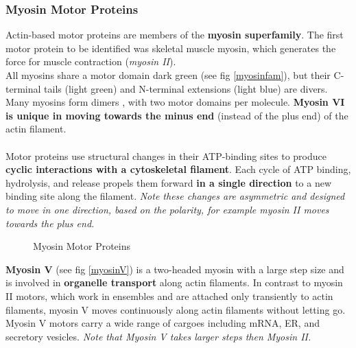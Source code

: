 \documentclass[../main.tex]{subfiles}
\begin{document}
\subsubsection{Myosin Motor Proteins}
Actin-based motor proteins are members of the \textbf{myosin superfamily}. The first motor protein to be identified was skeletal muscle myosin, which generates the force for muscle contraction (\textit{myosin II}). \\
\indent All myosins share a motor domain dark green (see fig \ref{myosinfam}), but their C-terminal tails (light green) and N-terminal extensions (light blue) are divers. \\
\indent Many myosins form dimers , with two motor domains per molecule. \textbf{Myosin VI is unique in moving towards the minus end} (instead of the plus end) of the actin filament. \\
\\
Motor proteins use structural changes in their ATP-binding sites to produce \textbf{cyclic interactions with a cytoskeletal filament}. Each cycle of ATP binding, hydrolysis, and release propels them forward \textbf{in a single direction} to a new binding site along the filament. \textit{Note these changes are asymmetric and designed to move in one direction, based on the polarity, for example myosin II moves towards the plus end.} 
\begin{figure}[H]
	\centering
	\caption{Myosin Motor Proteins}
\end{figure}
\indent \textbf{Myosin V} (see fig \ref{myosinV}) is a two-headed myosin with a large step size and is involved in \textbf{organelle transport} along actin filaments. In contrast to myosin II motors, which work in ensembles and are attached only transiently to actin filaments, myosin V moves continuously along actin  filaments without letting go. Myosin V motors carry a wide range of cargoes including mRNA, ER, and secretory vesicles. \textit{Note that Myosin V takes larger steps then Myosin II.} \\
\end{document}
